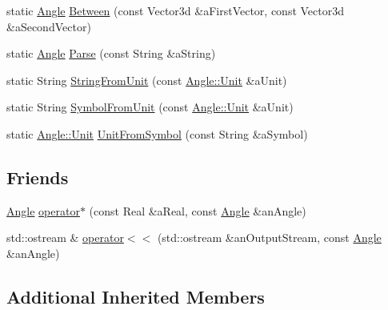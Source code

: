 \begin{DoxyCompactItemize}
\item 
static \hyperlink{classlibrary_1_1physics_1_1units_1_1_angle}{Angle} \hyperlink{classlibrary_1_1physics_1_1units_1_1_angle_ab7ce400fbca2bfd2ebe453e1685ad049}{Between} (const Vector3d \&a\+First\+Vector, const Vector3d \&a\+Second\+Vector)
\item 
static \hyperlink{classlibrary_1_1physics_1_1units_1_1_angle}{Angle} \hyperlink{classlibrary_1_1physics_1_1units_1_1_angle_adb15fc7d0b586672b91fa80a69b508f1}{Parse} (const String \&a\+String)
\item 
static String \hyperlink{classlibrary_1_1physics_1_1units_1_1_angle_a95d8f1d9e27062ca480b7c264a035283}{String\+From\+Unit} (const \hyperlink{classlibrary_1_1physics_1_1units_1_1_angle_a3c329d415a61783b16ce481874cc5956}{Angle\+::\+Unit} \&a\+Unit)
\item 
static String \hyperlink{classlibrary_1_1physics_1_1units_1_1_angle_a2f51939276e1d1c2121e1fc911e6ca30}{Symbol\+From\+Unit} (const \hyperlink{classlibrary_1_1physics_1_1units_1_1_angle_a3c329d415a61783b16ce481874cc5956}{Angle\+::\+Unit} \&a\+Unit)
\item 
static \hyperlink{classlibrary_1_1physics_1_1units_1_1_angle_a3c329d415a61783b16ce481874cc5956}{Angle\+::\+Unit} \hyperlink{classlibrary_1_1physics_1_1units_1_1_angle_a78686250c9216e06b93f595d40ddfef1}{Unit\+From\+Symbol} (const String \&a\+Symbol)
\end{DoxyCompactItemize}
\subsection*{Friends}
\begin{DoxyCompactItemize}
\item 
\hyperlink{classlibrary_1_1physics_1_1units_1_1_angle}{Angle} \hyperlink{classlibrary_1_1physics_1_1units_1_1_angle_af699984b24759466957ecddaa7e61fc9}{operator$\ast$} (const Real \&a\+Real, const \hyperlink{classlibrary_1_1physics_1_1units_1_1_angle}{Angle} \&an\+Angle)
\item 
std\+::ostream \& \hyperlink{classlibrary_1_1physics_1_1units_1_1_angle_a0846b77ee3281e8a559197c3c3208eed}{operator$<$$<$} (std\+::ostream \&an\+Output\+Stream, const \hyperlink{classlibrary_1_1physics_1_1units_1_1_angle}{Angle} \&an\+Angle)
\end{DoxyCompactItemize}
\subsection*{Additional Inherited Members}


